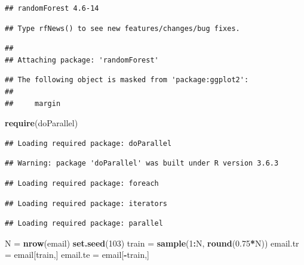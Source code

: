 \documentclass[
]{article}
\newenvironment{Shaded}{\begin{snugshade}}{\end{snugshade}}
\newcommand{\DecValTok}[1]{\textcolor[rgb]{0.00,0.00,0.81}{#1}}
\newcommand{\FloatTok}[1]{\textcolor[rgb]{0.00,0.00,0.81}{#1}}
\newcommand{\KeywordTok}[1]{\textcolor[rgb]{0.13,0.29,0.53}{\textbf{#1}}}
\newcommand{\NormalTok}[1]{#1}
\newcommand{\OperatorTok}[1]{\textcolor[rgb]{0.81,0.36,0.00}{\textbf{#1}}}
\newcommand{\StringTok}[1]{\textcolor[rgb]{0.31,0.60,0.02}{#1}}
\begin{document}
\begin{verbatim}
## randomForest 4.6-14
\end{verbatim}

\begin{verbatim}
## Type rfNews() to see new features/changes/bug fixes.
\end{verbatim}

\begin{verbatim}
## 
## Attaching package: 'randomForest'
\end{verbatim}

\begin{verbatim}
## The following object is masked from 'package:ggplot2':
## 
##     margin
\end{verbatim}

\begin{Shaded}
\begin{Highlighting}[]
\KeywordTok{require}\NormalTok{(doParallel)}
\end{Highlighting}
\end{Shaded}

\begin{verbatim}
## Loading required package: doParallel
\end{verbatim}

\begin{verbatim}
## Warning: package 'doParallel' was built under R version 3.6.3
\end{verbatim}

\begin{verbatim}
## Loading required package: foreach
\end{verbatim}

\begin{verbatim}
## Loading required package: iterators
\end{verbatim}

\begin{verbatim}
## Loading required package: parallel
\end{verbatim}

\begin{Shaded}
\begin{Highlighting}[]
\NormalTok{N =}\StringTok{ }\KeywordTok{nrow}\NormalTok{(email)}
\KeywordTok{set.seed}\NormalTok{(}\DecValTok{103}\NormalTok{)}
\NormalTok{train =}\StringTok{ }\KeywordTok{sample}\NormalTok{(}\DecValTok{1}\OperatorTok{:}\NormalTok{N, }\KeywordTok{round}\NormalTok{(}\FloatTok{0.75}\OperatorTok{*}\NormalTok{N))}
\NormalTok{email.tr =}\StringTok{ }\NormalTok{email[train,]}
\NormalTok{email.te =}\StringTok{ }\NormalTok{email[}\OperatorTok{-}\NormalTok{train,]}
\end{Highlighting}
\end{Shaded}
\end{document}
